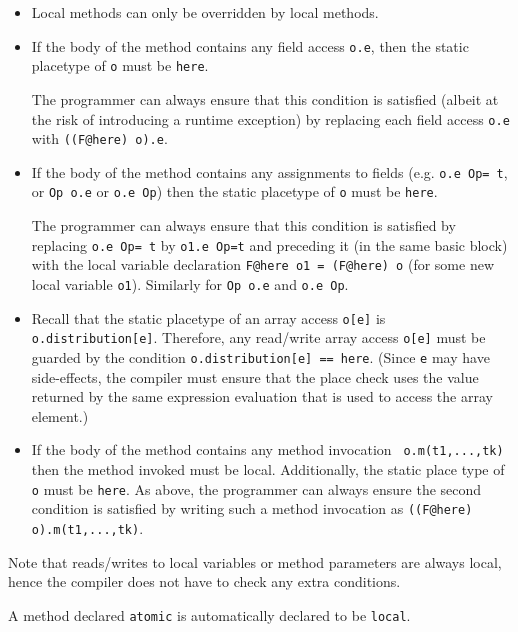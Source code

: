 \begin{itemize}
\item Local methods can only be overridden by local methods. 

\item If the body of the method contains any field access {\tt o.e}, then
the static placetype of {\tt o} must be {\tt here}. 

The programmer can always ensure that this condition is satisfied
(albeit at the risk of introducing a runtime exception) by replacing
each field access {\tt o.e} with {\tt ((F@here) o).e}.

\item If the body of the method contains any assignments to fields
(e.g. {\tt o.e Op= t}, or {\tt Op o.e} or {\tt o.e Op}) then the
static placetype of {\tt o} must be {\tt here}.

The programmer can always ensure that this condition is satisfied by
replacing {\tt o.e Op= t} by {\tt o1.e Op=t} and preceding it (in the
same basic block) with the local variable declaration {\tt F@here o1 =
(F@here) o} (for some new local variable {\tt o1}). Similarly for
{\tt Op o.e} and {\tt o.e Op}.

\item Recall that the static placetype of an array access {\tt o[e]}
is {\tt o.distribution[e]}. Therefore, any read/write array access
{\tt o[e]} must be guarded by the condition {\tt o.distribution[e] ==
here}.  (Since  {\tt e} may have side-effects, the compiler must
ensure that the place check uses the value returned by the same
expression evaluation that is used to access the array element.)

\item If the body of the method contains any method invocation {\tt
o.m(t1,...,tk)} then the method invoked must be local. Additionally,
the static place type of {\tt o} must be {\tt here}. 
As above, the programmer can always ensure the second
condition is satisfied by writing such a method invocation
as {\tt ((F@here) o).m(t1,...,tk)}.
\end{itemize}

Note that reads/writes to local variables or method parameters are
always local, hence the compiler does not have to check any extra
conditions.

A method declared {\tt atomic} is automatically declared
to be {\tt local}.
